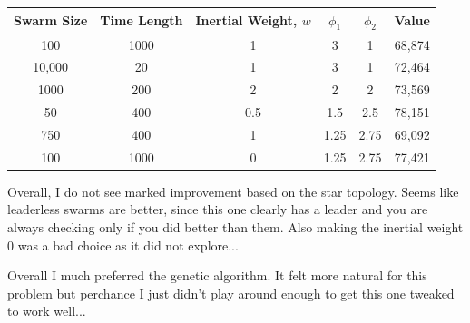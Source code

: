 \documentclass[11pt]{article}
\begin{document}
\begin{enumerate}
\begin{enumerate}
\begin{tabular}{|c|c|c|c|c|c|}\hline
Swarm Size &Time Length & Inertial Weight, $w$ &$\phi_1$ & $\phi_2$& Value\\ \hline
100&1000&1&3&1&68,874\\
10,000&20&1&3&1&72,464\\
1000&200&2&2&2&73,569\\
50&400&0.5&1.5&2.5&78,151\\
750&400&1&1.25&2.75& 69,092\\
100&1000&0&1.25&2.75& 77,421
\\ \hline
\end{tabular}

Overall, I do not see marked improvement based on the star topology.  Seems like leaderless swarms are better, since this one clearly has a leader and you are always checking only if you did better than them.  Also making the inertial weight 0 was a bad choice as it did not explore...  
\end{enumerate}
\end{enumerate}
Overall I much preferred the genetic algorithm.  It felt more natural for this problem but perchance I just didn't play around enough to get this one tweaked to work well...
\end{document}
